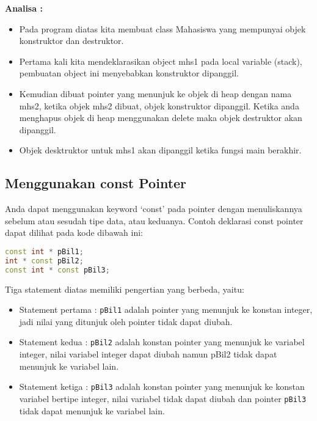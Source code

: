 \textbf{Analisa :}

\begin{itemize}

\item
  Pada program diatas kita membuat class Mahasiswa yang mempunyai objek
  konstruktor dan destruktor.
\item
  Pertama kali kita mendeklarasikan object mhs1 pada local variable
  (stack), pembuatan object ini menyebabkan konstruktor dipanggil.
\item
  Kemudian dibuat pointer yang menunjuk ke objek di heap dengan nama
  mhs2, ketika objek mhs2 dibuat, objek konstruktor dipanggil. Ketika
  anda menghapus objek di heap menggunakan delete maka objek destruktor
  akan dipanggil.
\item
  Objek desktruktor untuk mhs1 akan dipanggil ketika fungsi main
  berakhir.
\end{itemize}

\subsection{Menggunakan const Pointer}\label{menggunakan-const-pointer}

Anda dapat menggunakan keyword `const' pada pointer dengan menuliskannya
sebelum atau sesudah tipe data, atau keduanya. Contoh deklarasi const
pointer dapat dilihat pada kode dibawah ini:

\begin{lstlisting}[language=c++, numbers=none]
const int * pBil1;
int * const pBil2;
const int * const pBil3;
\end{lstlisting}

Tiga statement diatas memiliki pengertian yang berbeda, yaitu:

\begin{itemize}

\item
  Statement pertama : \texttt{pBil1} adalah pointer yang menunjuk ke
  konstan integer, jadi nilai yang ditunjuk oleh pointer tidak dapat
  diubah.
\item
  Statement kedua : \texttt{pBil2} adalah konstan pointer yang menunjuk
  ke variabel integer, nilai variabel integer dapat diubah namun pBil2
  tidak dapat menunjuk ke variabel lain.
\item
  Statement ketiga : \texttt{pBil3} adalah konstan pointer yang menunjuk
  ke konstan variabel bertipe integer, nilai variabel tidak dapat diubah
  dan pointer \texttt{pBil3} tidak dapat menunjuk ke variabel lain.
\end{itemize}

